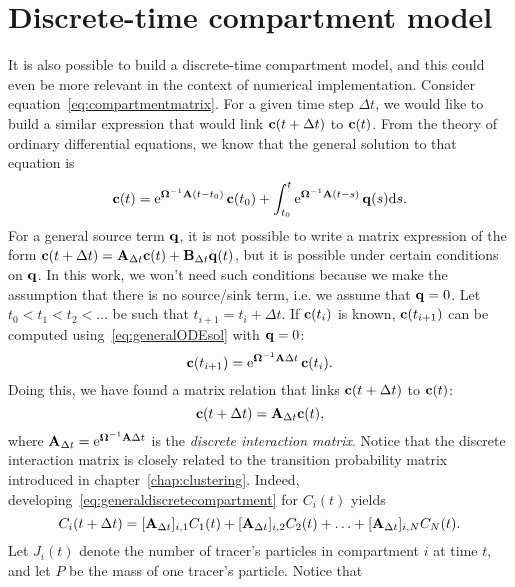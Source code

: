 \section{Discrete-time compartment model} \label{sec:dtcm(chapcomp)}
It is also possible to build a discrete-time compartment model, and this could even be more relevant in the context of numerical implementation. Consider equation~\eqref{eq:compartmentmatrix}. For a given time step $\Delta t$, we would like to build a similar expression that would link $\mathbf c(t+\Delta t)$ to $\mathbf c(t)$. From the theory of ordinary differential equations, we know that the general solution to that equation is
\begin{equation} \label{eq:generalODEsol}
	\mathbf c(t) = \operatorname{e}^{\boldsymbol \Omega^{-1}\mathbf A(t-t_0)} \mathbf c(t_0) + \int_{t_0}^t \operatorname{e}^{\boldsymbol \Omega^{-1}\mathbf A(t-s)} \mathbf q(s) \mathrm ds.
\end{equation}
For a general source term $\mathbf q$, it is not possible to write a matrix expression of the form $\mathbf c(t+\Delta t) = \mathbf A_{\Delta t} \mathbf c(t) + \mathbf B_{\Delta t} \mathbf q(t)$, but it is possible under certain conditions on $\mathbf q$. In this work, we won't need such conditions because we make the assumption that there is no source/sink term, i.e. we assume that $\mathbf q = 0$. Let $t_0 < t_1 < t_2 < \dots$ be such that $t_{i+1} = t_i + \Delta t$. If $\mathbf c(t_i)$ is known, $\mathbf c(t_{i+1})$ can be computed using~\eqref{eq:generalODEsol} with $\mathbf q = 0$:
\begin{equation}
	\mathbf c(t_{i+1}) = \operatorname{e}^{\boldsymbol \Omega^{-1}\mathbf A\Delta t} \mathbf c(t_i).
\end{equation}
Doing this, we have found a matrix relation that links $\mathbf c(t+\Delta t)$ to $\mathbf c(t)$:
\begin{equation} \label{eq:generaldiscretecompartment}
	\mathbf c(t + \Delta t) = \mathbf A_{\Delta t} \mathbf c(t),
\end{equation}
where $\mathbf A_{\Delta t} = \operatorname{e}^{\boldsymbol \Omega^{-1}\mathbf A\Delta t}$ is the \textit{discrete interaction matrix}. Notice that the discrete interaction matrix is closely related to the transition probability matrix introduced in chapter~\ref{chap:clustering}. Indeed, developing~\eqref{eq:generaldiscretecompartment} for $C_i(t)$ yields
\begin{equation} \label{eq:crapaud}
	C_i(t+\Delta t) = [\mathbf A_{\Delta t}]_{i,1} C_{1}(t) + [\mathbf A_{\Delta t}]_{i,2} C_{2}(t) + \ldots + [\mathbf A_{\Delta t}]_{i,N} C_{N}(t).  	
\end{equation}
Let $J_i(t)$ denote the number of tracer's particles in compartment $i$ at time $t$, and let $P$ be the mass of one tracer's particle. Notice that

